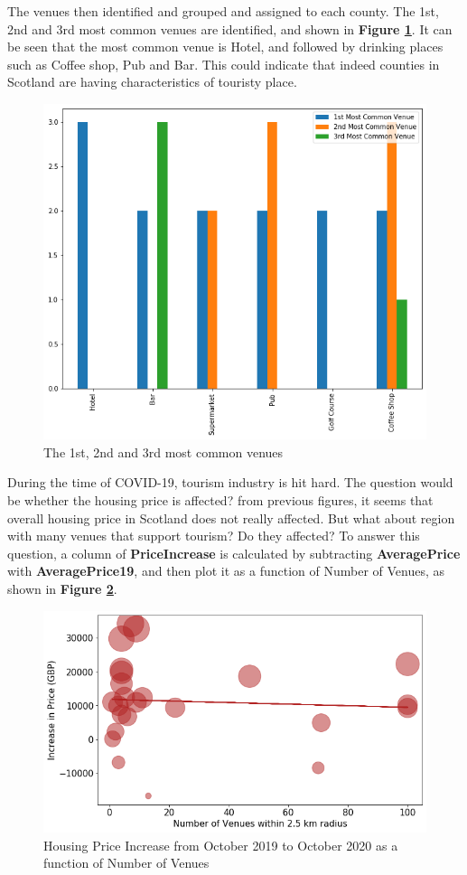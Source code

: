 \documentclass{homeworg}
\begin{document}
The venues then identified and grouped and assigned to each county. The 1st, 2nd and 3rd most common venues are identified, and shown in \textbf{Figure \ref{fig:fig10}}. It can be seen that the most common venue is Hotel, and followed by drinking places such as Coffee shop, Pub and Bar. This could indicate that indeed counties in Scotland are having characteristics of touristy place.
\begin{figure}[!h]
    \centering
    \includegraphics[scale=0.6]{figure/Figure_8_Venues_Most_Common_Barplot.png}
    \caption{The 1st, 2nd and 3rd most common venues}
    \label{fig:fig10}
\end{figure}
\FloatBarrier
During the time of COVID-19, tourism industry is hit hard. The question would be whether the housing price is affected? from previous figures, it seems that overall housing price in Scotland does not really affected. But what about region with many venues that support tourism? Do they affected? To answer this question, a column of \textbf{PriceIncrease} is calculated by subtracting \textbf{AveragePrice} with \textbf{AveragePrice19}, and then plot it as a function of Number of Venues, as shown in \textbf{Figure \ref{fig:fig11}}. 
\begin{figure}[!h]
    \centering
    \includegraphics[scale=0.6]{figure/Figure_11_NumOfVenues_VS_IncreaseInPRice.png}
    \caption{Housing Price Increase from October 2019 to October 2020 as a function of Number of Venues}
    \label{fig:fig11}
\end{figure}
\end{document}
